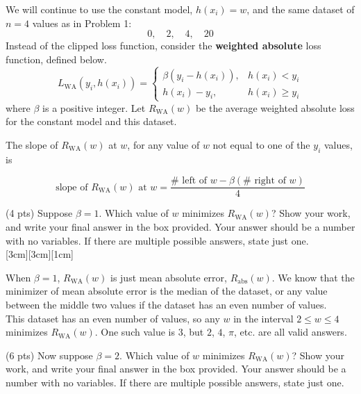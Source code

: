 \documentclass[11pt]{article}
\begin{document}
\newpage

\begin{prob}[(10 pts)]
We will continue to use the constant model, $h(x_i)=w$, and the same dataset of $n=4$ values as in Problem 1:
\[
0,\quad 2,\quad 4,\quad 20
\]
Instead of the clipped loss function, consider the \textbf{weighted absolute} loss function, defined below.
\[
L_\text{WA}(y_i,h(x_i))=
\begin{cases}
\beta(y_i-h(x_i)), & h(x_i)<y_i \\
h(x_i)-y_i, & h(x_i)\ge y_i
\end{cases}
\]
where $\beta$ is a positive integer. Let $R_\text{WA}(w)$ be the average weighted absolute loss for the constant model and this dataset.

The slope of $R_\text{WA}(w)$ at $w$, for any value of $w$ not equal to one of the $y_i$ values, is

$$\text{slope of } R_\text{WA}(w) \text{ at } w = \frac{\#\text{ left of } w - \beta(\#\text{ right of } w)}{4}$$

\begin{subprob}(4 pts) Suppose $\beta = 1$. Which value of $w$ minimizes $R_\text{WA}(w)$? Show your work, and write your final answer in the box provided. Your answer should be a number with no variables. If there are multiple possible answers, state just one. \\

[3cm][3cm][1cm]
\begin{solution}
When $\beta = 1$, $R_{\text{WA}}(w)$ is just mean absolute error, $R_\text{abs}(w)$. We know that the minimizer of mean absolute error is the median of the dataset, or any value between the middle two values if the dataset has an even number of values. \\

This dataset has an even number of values, so any $w$ in the interval $2 \leq w \leq 4$ minimizes $R_\text{WA}(w)$. One such value is $\boxed{3}$, but $2$, $4$, $\pi$, etc. are all valid answers.
\end{solution}
\end{subprob}

\begin{subprob}(6 pts) Now suppose $\beta = 2$. Which value of $w$ minimizes $R_\text{WA}(w)$? Show your work, and write your final answer in the box provided. Your answer should be a number with no variables. If there are multiple possible answers, state just one. \\


\end{subprob}
\end{prob}
\end{document}
